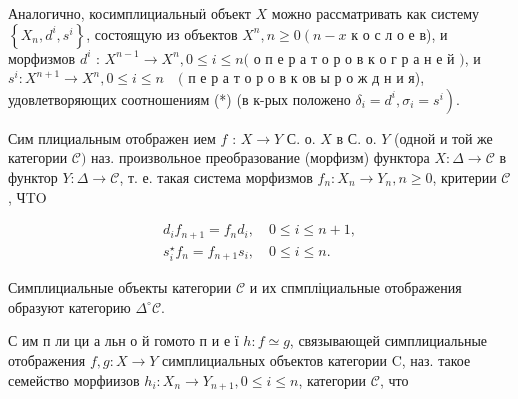 \documentclass[10pt]{article}
\begin{document}
Аналогично, косимплициальныӥ объект $X$ можно рассматривать как систему $\left\{X_{n}, d^{i}, s^{i}\right\}$, состоящую из объектов $X^{n}, n \geqslant 0\left(n-x\right.$ к о с л о е в), и морфизмов $d^{i}$ : $X^{n-1} \rightarrow X^{n}, 0 \leqslant i \leqslant n($ о п е р а т о р о в к о г р а н е й $)$, и $s^{i}: X^{n+1} \rightarrow X^{n}, 0 \leqslant i \leqslant n \quad($ п е р а т о р о в к ов ы р о ж д н и я), удовлетворяющих соотношениям (*) (в к-рых положено $\left.\delta_{i}=d^{i}, \sigma_{i}=s^{i}\right)$.



Сим плициальным отображен ием $f$ : $X \rightarrow Y$ С. о. $X$ в С. о. $Y$ (одной и той же категории $\mathscr{C})$ наз. произвольное преобразование (морфизм) функтора $X: \Delta \rightarrow \mathscr{C}$ в функтор $Y: \Delta \rightarrow \mathscr{C}$, т. е. такая система морфизмов $f_{n}: X_{n} \rightarrow Y_{n}, n \geqslant 0$, критерии $\mathscr{C}$, ЧTO



\[

\begin{gathered}

d_{i} f_{n+1}=f_{n} d_{i}, \quad 0 \leqslant i \leqslant n+1, \\

s_{i}^{\star} f_{n}=f_{n+1} s_{i}, \quad 0 \leqslant i \leqslant n .

\end{gathered}

\]



Симплициальные объекты категории $\mathscr{C}$ и их спмпліциальные отображения образуют категорию $\Delta^{\circ} \mathscr{C}$.



С им п ли ци а льн о й гомото п и е ї $h: f \simeq g$, связывающей симплициальные отображения $f, g: X \rightarrow Y$ симплициальных объектов категории $\mathrm{C}$, наз. такое семейство морфиизов $h_{i}: X_{n} \rightarrow Y_{n+1}, 0 \leqslant i \leqslant n$, категории $\mathscr{C}$, что
\end{document}
